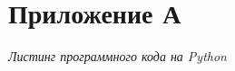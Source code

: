 \section{}\label{section-5}

\section{}\label{section-6}

\section{}\label{section-7}

\section{}\label{section-8}

\section{}\label{section-9}

\section{}\label{section-10}

\section{}\label{section-11}

\section{}\label{section-12}

\section{}\label{section-13}

\section{}\label{section-14}

\section{Приложение А}\label{ux43fux440ux438ux43bux43eux436ux435ux43dux438ux435-ux430}

\emph{Листинг программного кода на Python}

